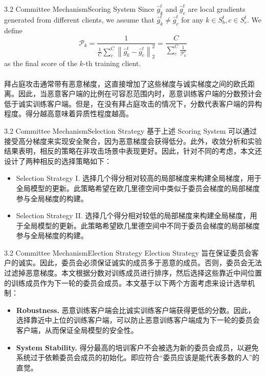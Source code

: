 \documentclass{sintefbeamer}
\theoremstyle{definition}
\begin{document}
\begin{frame}{3.2 Committee Mechanism}{Scoring System}
Since $\hat{g}_k^t$ and $\hat{g}_c^t$ are local gradients generated from different clients, we assume that $\hat{g}_k^t \neq \hat{g}_c^t$ for any $k \in S_b^t, c \in S_c^t$. We define 
$$
\mathcal{P}_k=\frac{1}{\frac{1}{C} \sum_c^C\left\|\hat{g}_k^t-\hat{g}_c^t\right\|_2^2}=\frac{C}{\sum_c^C \frac{1}{\mathcal{P}_k^c}}
$$
as the final score of the $k$-th training client. 
\\ \hspace*{\fill} \\
拜占庭攻击通常带有恶意梯度，这直接增加了这些梯度与诚实梯度之间的欧氏距离。因此，当恶意客户端的比例在可容忍范围内时，恶意训练客户端的分数预计会低于诚实训练客户端。但是，在没有拜占庭攻击的情况下，分数代表客户端的异构程度。得分越高意味着异质性程度越高。
\end{frame}

\begin{frame}{3.2 Committee Mechanism}{Selection Strategy}
基于上述 Scoring System 可以通过接受高分梯度来实现安全聚合，因为恶意梯度会获得低分。此外，收敛分析和实验结果表明，相反的策略在非攻击场景中表现更好。因此，针对不同的考虑，本文还设计了两种相反的选择策略如下：
\begin{itemize}
\item Selection Strategy I. 选择几个得分相对较高的局部梯度来构建全局梯度，用于全局模型的更新。此策略希望在欧几里德空间中类似于委员会梯度的局部梯度参与全局梯度的构建。
\item Selection Strategy II. 选择几个得分相对较低的局部梯度来构建全局梯度，用于全局模型的更新。此策略希望欧几里德空间中不同于委员会梯度的局部梯度参与全局梯度的构建。
\end{itemize}
\end{frame}

\begin{frame}{3.2 Committee Mechanism}{Election Strategy}
Election Strategy 旨在保证委员会客户的诚实。因此，委员会必须保证诚实的成员多于恶意的成员。否则，委员会无法过滤掉恶意梯度。本文根据分数对训练成员进行排序，然后选择这些靠近中间位置的训练成员作为下一轮的委员会成员。本文基于以下两个方面考虑来设计选举机制：
\begin{itemize}
\item \textbf{Robustness. } 恶意训练客户端会比诚实训练客户端获得更低的分数。因此，选择靠近中上位的训练客户端，可以防止恶意训练客户端成为下一轮的委员会客户端，从而保证全局模型的安全性。
\item \textbf{System Stability. } 得分最高的培训客户不会被选为新的委员会成员，以避免系统过于依赖委员会成员的初始化。即应符合“委员应该是能代表多数的人”的直觉。
\end{itemize}


\end{frame}
\end{document}
